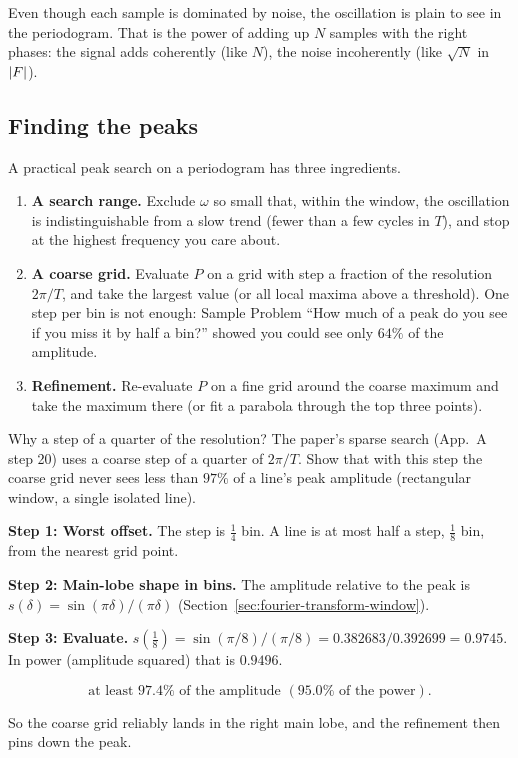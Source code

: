 Even though each sample is dominated by noise, the oscillation is plain to see in the periodogram. That is the power of adding up $N$ samples with the right phases: the signal adds coherently (like $N$), the noise incoherently (like $\sqrt N$ in $\left\lvert F\right\rvert$).

\subsection{Finding the peaks}

A practical peak search on a periodogram has three ingredients.
\begin{enumerate}
\item \textbf{A search range.} Exclude $\omega$ so small that, within the window, the oscillation is indistinguishable from a slow trend (fewer than a few cycles in $T$), and stop at the highest frequency you care about.
\item \textbf{A coarse grid.} Evaluate $P$ on a grid with step a fraction of the resolution $2\pi/T$, and take the largest value (or all local maxima above a threshold). One step per bin is not enough: Sample Problem ``How much of a peak do you see if you miss it by half a bin?'' showed you could see only $64\%$ of the amplitude.
\item \textbf{Refinement.} Re-evaluate $P$ on a fine grid around the coarse maximum and take the maximum there (or fit a parabola through the top three points).
\end{enumerate}

\begin{sample}{Why a step of a quarter of the resolution?}
The paper's sparse search (App.~A step 20) uses a coarse step of a quarter of $2\pi/T$. Show that with this step the coarse grid never sees less than $97\%$ of a line's peak amplitude (rectangular window, a single isolated line).

\textbf{Step 1: Worst offset.} The step is $\tfrac14$ bin. A line is at most half a step, $\tfrac18$ bin, from the nearest grid point.

\textbf{Step 2: Main-lobe shape in bins.} The amplitude relative to the peak is $s(\delta)=\sin(\pi\delta)/(\pi\delta)$ (Section~\ref{sec:fourier-transform-window}).

\textbf{Step 3: Evaluate.} $s(\tfrac18)=\sin(\pi/8)/(\pi/8)=0.382683/0.392699=0.9745$. In power (amplitude squared) that is $0.9496$.

\[\boxed{\text{at least }97.4\%\text{ of the amplitude }(95.0\%\text{ of the power}).}\]
\end{sample}
So the coarse grid reliably lands in the right main lobe, and the refinement then pins down the peak.

